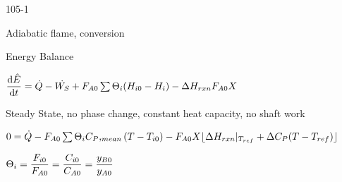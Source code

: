 \begin{mitframe}{105-1}
\begin{listone}
	\item Adiabatic flame, conversion
    \item Energy Balance
    	\begin{listtwo}
        	\item $\dfrac{\mathrm{d}\hat{\energy}}{\mathrm{d}\timet}=\dot{\heatflow}-\dot{\work_{\entropy}}+\force_{\helmholtz\init}\sum\nolimits\dimltemp_{\state}(\enthalpy_{\state\init}-\enthalpy_{\state})-\iipf\enthalpy_{rxn}\force_{\helmholtz\init}X$
            \item Steady State, no phase change, constant heat capacity, no shaft work
            	\begin{listthree}
                	\item $0=\dot{\heatflow}-\force_{\helmholtz\init}\sum\dimltemp_{\state}\cp,_{mean}(\Temp-\Temp_{\state\init})-\force_{\helmholtz\init}X\lfloor\iipf\enthalpy_{rxn}|_{\Temp_{ref}}+\iipf\cp(\Temp-\Temp_{ref})\rfloor$
                    \item $\dimltemp_{\state}=\dfrac{\force_{\state\init}}{\force_{\helmholtz\init}}=\dfrac{\conc_{\state\init}}{\conc_{\helmholtz\init}}=\dfrac{y_{\exergy\init}}{y_{\helmholtz\init}}$
                \end{listthree}
        \end{listtwo}
    \end{listone}    
\end{mitframe}